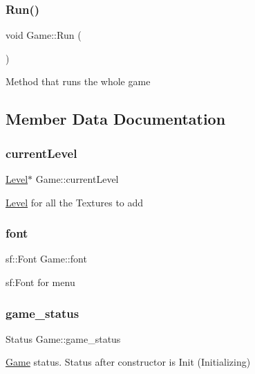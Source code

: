 \subsubsection{\texorpdfstring{Run()}{Run()}}
{\footnotesize\ttfamily void Game\+::\+Run (\begin{DoxyParamCaption}{ }\end{DoxyParamCaption})}

Method that runs the whole game 

\subsection{Member Data Documentation}
\mbox{\label{class_game_a29bbdc3d17b8f654a6d74191f4cf0484}} 
\subsubsection{\texorpdfstring{currentLevel}{currentLevel}}
{\footnotesize\ttfamily \mbox{\hyperlink{class_level}{Level}}$\ast$ Game\+::current\+Level\hspace{0.3cm}{\ttfamily [private]}}

\mbox{\hyperlink{class_level}{Level}} for all the Textures to add \mbox{\label{class_game_af729561d89036f0c841bc1a428dc43cf}} 
\subsubsection{\texorpdfstring{font}{font}}
{\footnotesize\ttfamily sf\+::\+Font Game\+::font\hspace{0.3cm}{\ttfamily [private]}}

sf\+:Font for menu \mbox{\label{class_game_a6312a6183e4e13ba6e413c02d06f3f84}} 
\subsubsection{\texorpdfstring{game\_status}{game\_status}}
{\footnotesize\ttfamily Status Game\+::game\+\_\+status\hspace{0.3cm}{\ttfamily [private]}}

\mbox{\hyperlink{class_game}{Game}} status. Status after constructor is Init (Initializing) \mbox{\label{class_game_a223de215aeb661cd423ac145756cc730}} 
